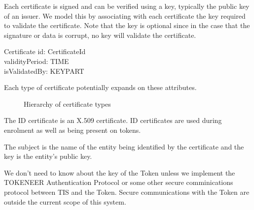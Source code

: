 Each certificate is signed and can be verified using a key, typically the
public key of an issuer. We model this by associating with each
certificate the key required to validate the certificate. Note that
the key is optional since in the case that the signature or data is
corrupt, no key will validate the certificate.

\begin{schema}{Certificate}
        id: CertificateId
\\	validityPeriod: \power TIME
\\      isValidatedBy: \Optional KEYPART
\end{schema}

Each type of certificate potentially expands on these attributes.

\begin{figure}[htbp]
  \begin{center}
    \leavevmode
    \caption{Hierarchy of certificate types}
    \label{fig:certificates}
  \end{center}
\end{figure}

The ID certificate is an X.509 certificate. ID certificates are used
during enrolment as well as being present on tokens.

The subject is the name of the entity being identified by the
certificate and the key is the entity's public key. 

We don't need to know about the key of the Token unless we implement 
the TOKENEER Authentication Protocol or some other secure
comminications protocol between TIS and the Token. Secure
communications with the Token are outside the current scope of this system.

